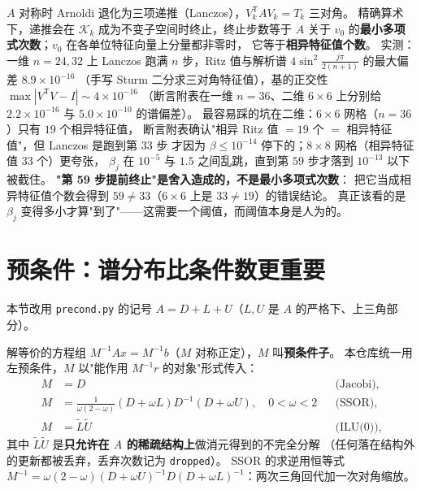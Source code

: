 \begin{remark}
\label{rem:lanczos}
$A$ 对称时 Arnoldi 退化为三项递推（Lanczos），$V_k^{\mathsf T}AV_k=T_k$ 三对角。
精确算术下，递推会在 $\mathcal K_k$ 成为不变子空间时终止，终止步数等于
$A$ 关于 $v_0$ 的\textbf{最小多项式次数}；$v_0$ 在各单位特征向量上分量都非零时，
它等于\textbf{相异特征值个数}。
实测：一维 $n=24,32$ 上 Lanczos 跑满 $n$ 步，Ritz 值与解析谱
$4\sin^2\frac{j\pi}{2(n+1)}$ 的最大偏差 $8.9\times10^{-16}$
（手写 Sturm 二分求三对角特征值），基的正交性 $\max|V^{\mathsf T}V-I|\sim4\times10^{-16}$
（断言附表在一维 $n=36$、二维 $6\times6$ 上分别给 $2.2\times10^{-16}$ 与 $5.0\times10^{-10}$ 的谱偏差）。
最容易踩的坑在二维：$6\times6$ 网格（$n=36$）只有 $19$ 个相异特征值，
断言附表确认"相异 Ritz 值 $=19$ 个 $=$ 相异特征值"，但 Lanczos 是跑到第 $33$ 步
才因为 $\beta\le10^{-14}$ 停下的；$8\times8$ 网格（相异特征值 $33$ 个）更夸张，
$\beta_j$ 在 $10^{-5}$ 与 $1.5$ 之间乱跳，直到第 $59$ 步才落到 $10^{-13}$ 以下被截住。
\textbf{"第 59 步提前终止"是舍入造成的，不是最小多项式次数}：
把它当成相异特征值个数会得到 $59\ne33$（$6\times6$ 上是 $33\ne19$）的错误结论。
真正该看的是 $\beta_j$ 变得多小才算"到了"——这需要一个阈值，而阈值本身是人为的。
\end{remark}

\section{预条件：谱分布比条件数更重要}
\label{sec:precond}

本节改用 \texttt{precond.py} 的记号 $A=D+L+U$（$L,U$ 是 $A$ 的严格下、上三角部分）。

\begin{definition}[左预条件与三种预条件子]
解等价的方程组 $M^{-1}Ax=M^{-1}b$（$M$ 对称正定），$M$ 叫\textbf{预条件子}。
本仓库统一用左预条件，$M$ 以"能作用 $M^{-1}r$ 的对象"形式传入：
\begin{align}
  M&=D &&\text{(Jacobi)},\\
  M&=\frac{1}{\omega(2-\omega)}(D+\omega L)D^{-1}(D+\omega U),\quad 0<\omega<2
    &&\text{(SSOR)},\\
  M&=\tilde L\tilde U &&\text{(ILU(0))},
\end{align}
其中 $\tilde L\tilde U$ 是\textbf{只允许在 $A$ 的稀疏结构上}做消元得到的不完全分解
（任何落在结构外的更新都被丢弃，丢弃次数记为 \texttt{dropped}）。
SSOR 的求逆用恒等式
$M^{-1}=\omega(2-\omega)(D+\omega U)^{-1}D(D+\omega L)^{-1}$：两次三角回代加一次对角缩放。
\end{definition}

